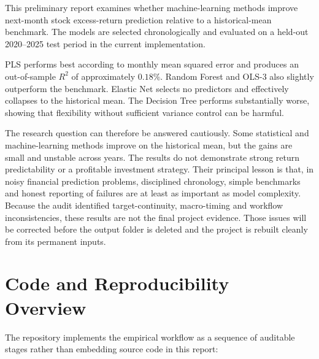 \documentclass[11pt,a4paper]{article}
\begin{document}
This preliminary report examines whether machine-learning methods improve next-month stock
excess-return prediction relative to a historical-mean benchmark. The models
are selected chronologically and evaluated on a held-out 2020--2025 test
period in the current implementation.

PLS performs best according to monthly mean squared error and produces an
out-of-sample \(R^2\) of approximately \(0.18\%\). Random Forest and OLS-3 also
slightly outperform the benchmark. Elastic Net selects no predictors and
effectively collapses to the historical mean. The Decision Tree performs
substantially worse, showing that flexibility without sufficient variance
control can be harmful.

The research question can therefore be answered cautiously. Some statistical
and machine-learning methods improve on the historical mean, but the gains are
small and unstable across years. The results do not demonstrate strong return
predictability or a profitable investment strategy. Their principal lesson is
that, in noisy financial prediction problems, disciplined chronology, simple
benchmarks and honest reporting of failures are at least as important as model
complexity. Because the audit identified target-continuity, macro-timing and
workflow inconsistencies, these results are not the final project evidence.
Those issues will be corrected before the output folder is deleted and the
project is rebuilt cleanly from its permanent inputs.


\FloatBarrier
\printbibliography[heading=bibintoc,title={References}]


\clearpage
\appendix

\section{Code and Reproducibility Overview}
\label{app:code-overview}

The repository implements the empirical workflow as a sequence of auditable
stages rather than embedding source code in this report:
\end{document}
